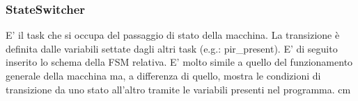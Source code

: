 \documentclass{article}
\begin{document}
\subsubsection{StateSwitcher}
E' il task che si occupa del passaggio di stato della macchina. La transizione è definita dalle variabili settate dagli altri task (e.g.: pir\_present). \newline
E' di seguito inserito lo schema della FSM relativa. E' molto simile a quello del funzionamento generale della macchina ma, a differenza di quello, mostra le condizioni di transizione da uno stato all'altro tramite le variabili presenti nel programma.
 cm
\begin{center}
\end{center}
\end{document}
